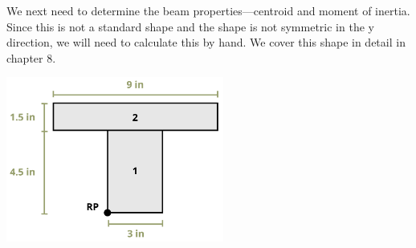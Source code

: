 \documentclass[
  letterpaper,
  DIV=11,
  numbers=noendperiod]{scrreprt}
\begin{document}
\begin{tcolorbox}
\begin{tcolorbox}
We next need to determine the beam properties---centroid and moment of
inertia. Since this is not a standard shape and the shape is not
symmetric in the y direction, we will need to calculate this by hand. We
cover this shape in detail in chapter 8.

\begin{center}
\includegraphics[width=2.8125in,height=\textheight]{images/CH9 PNGs/Example 9.1 part 3.png}
\end{center}


\end{tcolorbox}
\end{tcolorbox}
\end{document}
